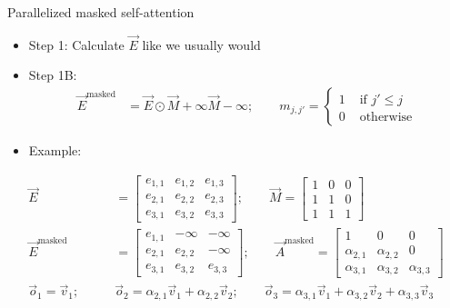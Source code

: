 \documentclass[11pt,compress,t,notes=noshow, xcolor=table]{beamer}
\begin{document}
\begin{frame}{Parallelized masked self-attention}

\vfill

\begin{itemize}
\item Step 1: Calculate $\vec E$ like we usually would
\item Step 1B:
$$
\begin{aligned}
\vec E^\mathrm{masked} & = \vec E \odot \vec M + \infty\vec M-\infty; \qquad m_{j,j'} = \begin{cases} 1 & \text{ if } j' \leq j \\ 0 & \text{ otherwise} \end{cases}
\end{aligned}
$$
\item Example:
\end{itemize}
$$
\begin{aligned}
\vec E & = \begin{bmatrix} e_{1,1} & e_{1,2} & e_{1,3} \\ e_{2,1} & e_{2,2} & e_{2,3} \\ e_{3,1} & e_{3,2} & e_{3,3} \end{bmatrix}; \qquad \vec M = \begin{bmatrix} 1 & 0 & 0 \\ 1 & 1 & 0 \\ 1 & 1 & 1 \end{bmatrix} \\
\vec E^\mathrm{masked} & = \begin{bmatrix} e_{1,1} & -\infty & -\infty \\ e_{2,1} & e_{2,2} & -\infty \\ e_{3,1} & e_{3,2} & e_{3,3} \end{bmatrix} ; \qquad \vec A^\mathrm{masked} = \begin{bmatrix} 1 & 0 & 0 \\ \alpha_{2,1} & \alpha_{2,2} & 0 \\ \alpha_{3,1} & \alpha_{3,2} & \alpha_{3,3} \end{bmatrix} \\
\vec o_1 = \vec v_1; \qquad & \vec o_2 = \alpha_{2,1} \vec v_1 + \alpha_{2,2} \vec v_2; \qquad \vec o_3 = \alpha_{3,1} \vec v_1 + \alpha_{3,2} \vec v_2 + \alpha_{3,3} \vec v_3
\end{aligned}
$$

\vfill

\end{frame}
\end{document}
